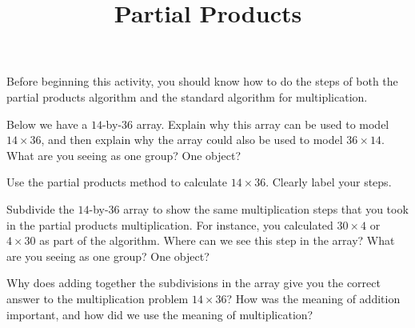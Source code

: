 \documentclass[nooutcomes,noauthor,handout]{ximera}
\title{Partial Products}
\begin{document}
\begin{abstract}
\end{abstract}

\maketitle

Before beginning this activity, you should know how to do the steps of both the partial products algorithm and the standard algorithm for multiplication.

\begin{problem}
Below we have a $14$-by-$36$ array. Explain why this array can be used to model $14 \times 36$, and then explain why the array could also be used to model $36 \times 14$. What are you seeing as one group? One object?

\begin{center} \end{center}
\end{problem}


\begin{problem}
Use the partial products method to calculate $14 \times 36$. Clearly label your steps.
\end{problem}


\begin{problem}
Subdivide the $14$-by-$36$ array to show the same multiplication steps that you took in the partial products multiplication. For instance, you calculated $30 \times 4$ or $4 \times 30$ as part of the algorithm. Where can we see this step in the array? What are you seeing as one group? One object?

\begin{center} \end{center}
\end{problem}


\begin{problem}
Why does adding together the subdivisions in the array give you the correct answer to the multiplication problem $14 \times 36$? How was the meaning of addition important, and how did we use the meaning of multiplication?
\end{problem}
\end{document}
